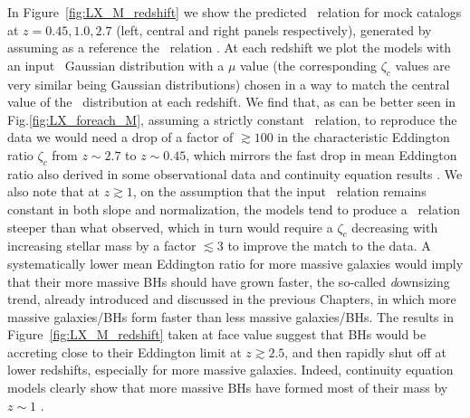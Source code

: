 In Figure~\ref{fig:LX_M_redshift} we show the predicted \LXMS\ relation for mock catalogs at $z=0.45,1.0,2.7$ (left, central and right panels respectively), generated by assuming as a reference the \citet{2015ApJ...813...82R} \MBHMS\ relation%
. 
At each redshift we plot the models with an input \PLz\ Gaussian distribution with a $\mu$ value (the corresponding $\zeta_c$ values are very similar being Gaussian distributions) chosen in a way to match the central value of the \LXMS\ distribution at each redshift.
We find that, as can be better seen in Fig.\ref{fig:LX_foreach_M}, assuming a strictly constant \MBHMS\ relation, to reproduce the data we would need a drop of a factor of $\gtrsim 100$ in the characteristic Eddington ratio $\zeta_c$ from $z\sim 2.7$ to $z\sim 0.45$, which mirrors the fast drop in mean Eddington ratio also derived in some observational data and continuity equation results \citep[see, e.g., Fig. 12 in][]{Shankar13Acc}. We also note that at $z \gtrsim 1$, on the assumption that the input \MBHMS\ relation remains constant in both slope and normalization, the models tend to produce a \LXMS\ relation steeper than what observed, which in turn would require a $\zeta_c$ decreasing with increasing stellar mass by a factor $\lesssim 3$ to improve the match to the data. A systematically lower mean Eddington ratio for more massive galaxies would imply that their more massive BHs should have grown faster, the so-called {\emph downsizing} trend, already introduced and discussed in the previous Chapters, in which more massive galaxies/BHs form faster than less massive galaxies/BHs. The results in Figure~\ref{fig:LX_M_redshift} taken at face value suggest that BHs would be accreting close to their Eddington limit at $z\gtrsim 2.5$, and then rapidly shut off at lower redshifts, especially for more massive galaxies. Indeed, continuity equation models clearly show that more massive BHs have formed most of their mass by $z\sim 1$ \citep[e.g.,][]{Marconi04,Shankar20MNRAS}.



